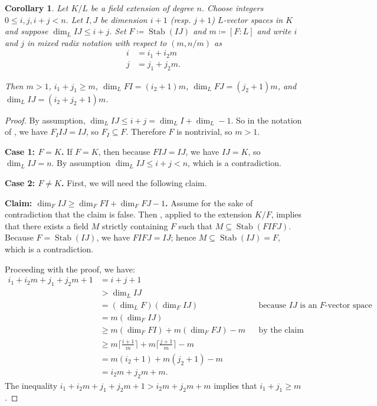 \documentclass[letterpaper,10pt]{amsart}
\DeclareMathOperator{\Stab}{Stab}
\newtheorem{corollary}[theorem]{Corollary}
\theoremstyle{definition}
\theoremstyle{remark}
\begin{document}
\begin{corollary}
\label{lem:overflow}
Let $K/L$ be a field extension of degree $n$. Choose integers $0 \leq i,j,i+j < n$. Let $I,J$ be dimension $i+1$ (resp. $j+1$) $L$-vector spaces in $K$ and suppose $\dim_{L}IJ \leq i+j$. Set $F \coloneqq \Stab(IJ)$ and $m \coloneqq [F : L]$ and write $i$ and $j$ in mixed radix notation with respect to $(m, n/m)$ as
\begin{align*}
i &= i_1 + i_2 m \\
j &= j_1 + j_2 m.
\end{align*}

Then $m > 1$, $i_1 + j_1 \geq m$, $\dim_{L} FI = (i_2 + 1)m$, $\dim_{L} FJ = (j_2 + 1)m$, and $\dim_{L} IJ = (i_2 + j_2 + 1)m$.
\end{corollary}
\begin{proof}
By assumption, $\dim_{L}IJ \leq i+j = \dim_L I + \dim_L - 1$. So in the notation of , we have $F_I IJ = IJ$, so $F_I \subseteq F$. Therefore $F$ is nontrivial, so $m > 1$. 

\noindent \textbf{Case 1: $F = K$.}
If $F = K$, then because $FIJ = IJ$, we have $IJ = K$, so $\dim_L IJ = n$. By assumption $\dim_{L}IJ \leq i + j < n$, which is a contradiction.

\noindent \textbf{Case 2: $F \neq K$.} 
First, we will need the following claim.

\noindent \textbf{Claim: $\dim_F IJ \geq  \dim_F FI + \dim_F FJ - 1$.}
Assume for the sake of contradiction that the claim is false. Then , applied to the extension $K/F$, implies that there exists a field $M$ strictly containing $F$ such that $M \subseteq \Stab(FIFJ)$. Because $F = \Stab(IJ)$, we have $FIFJ = IJ$; hence $M \subseteq \Stab(IJ) = F$, which is a contradiction. 

Proceeding with the proof, we have:
\begin{align}
i_1 + i_2m + j_1 + j_2m + 1 &= i + j + 1 && \\
&> \dim_L IJ && \\
&= (\dim_L F)(\dim_F IJ) && \text{because $IJ$ is an $F$-vector space} \\
&= m(\dim_F IJ) &&  \\
& \geq m(\dim_F FI) + m(\dim_F FJ) - m && \text{by the claim}\\
& \geq m\bigg \lceil \frac{i+1}{m}\bigg \rceil + m\bigg \lceil \frac{j+1}{m}\bigg \rceil - m && \\
&= m(i_2 + 1) + m(j_2 + 1) - m && \\
&= i_2m + j_2m + m. &&
\end{align}
The inequality $i_1 + i_2m + j_1 + j_2m + 1 > i_2m + j_2m + m$ implies that $i_1 + j_1 \geq m$. 


\end{proof}
\end{document}
